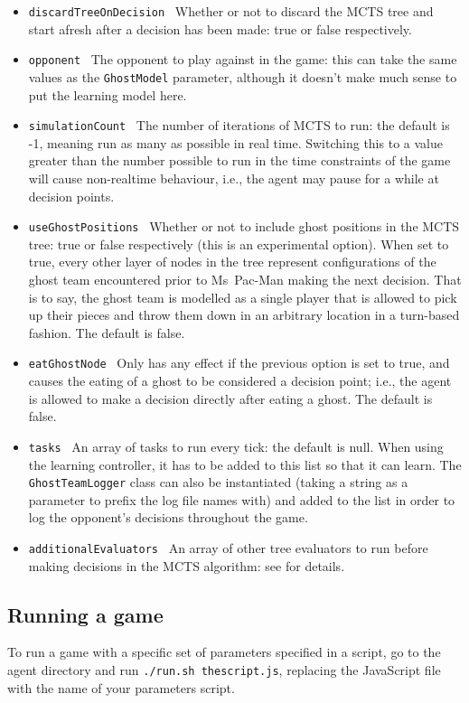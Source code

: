 \begin{itemize}
\item {\tt discardTreeOnDecision} ~Whether or not to discard the MCTS tree and start afresh after a decision has been made: true or false respectively.
\item {\tt opponent} ~The opponent to play against in the game: this can take the same values as the {\tt GhostModel} parameter, although it doesn't make much sense to put the learning model here.
\item {\tt simulationCount} ~The number of iterations of MCTS to run: the default is -1, meaning run as many as possible in real time.  Switching this to a value greater than the number possible to run in the time constraints of the game will cause non-realtime behaviour, i.e., the agent may pause for a while at decision points.
\item {\tt useGhostPositions} ~Whether or not to include ghost positions in the MCTS tree: true or false respectively (this is an experimental option).  When set to true, every other layer of nodes in the tree represent configurations of the ghost team encountered prior to Ms~Pac-Man making the next decision.  That is to say, the ghost team is modelled as a single player that is allowed to pick up their pieces and throw them down in an arbitrary location in a turn-based fashion.  The default is false.
\item {\tt eatGhostNode} ~Only has any effect if the previous option is set to true, and causes the eating of a ghost to be considered a decision point; i.e., the agent is allowed to make a decision directly after eating a ghost.  The default is false.
\item {\tt tasks} ~An array of tasks to run every tick: the default is null.  When using the learning controller, it has to be added to this list so that it can learn.  The {\tt GhostTeamLogger} class can also be instantiated (taking a string as a parameter to prefix the log file names with) and added to the list in order to log the opponent's decisions throughout the game.
\item {\tt additionalEvaluators} ~An array of other tree evaluators to run before making decisions in the MCTS algorithm: see \cite{Me2012} for details.
\end{itemize}

\subsection{Running a game}

To run a game with a specific set of parameters specified in a script, go to the agent directory and run {\tt ./run.sh thescript.js}, replacing the JavaScript file with the name of your parameters script.

